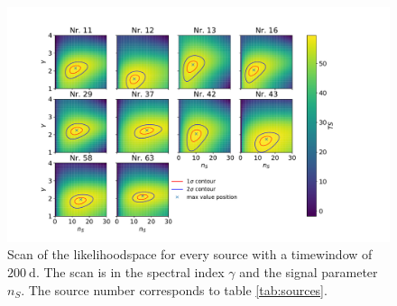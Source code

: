 \begin{figure}
    \centering
    \includegraphics[width=\linewidth]{Plots/05_csky/llh_scan.pdf}
    \caption{Scan of the likelihoodspace for every source with a timewindow of $\SI{200}{\day}$. The scan is in the spectral index $\gamma$ and the signal parameter $n_S$. The source number corresponds to table \ref{tab:sources}.}
\end{figure}
